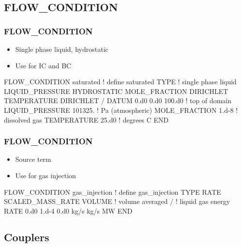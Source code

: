 \documentclass{beamer}
\newcommand\redcomment[1]{{{\color{red} #1}}}
\newcommand\bluecomment[1]{{{\color{blue} #1}}}
\newcommand\greencomment[1]{{{\color{green} #1}}}
\begin{document}
\subsection{FLOW\_CONDITION}

\begin{frame}[fragile]\frametitle{FLOW\_CONDITION}
\begin{itemize}
  \item{Single phase liquid, hydrostatic}
  \item{Use for \redcomment{IC} and \redcomment{BC}}
\end{itemize}

\begin{semiverbatim}
FLOW_CONDITION saturated \bluecomment{! define }\greencomment{saturated} 
  TYPE                   \bluecomment{! single phase liquid}
    LIQUID_PRESSURE HYDROSTATIC
    MOLE_FRACTION DIRICHLET
    TEMPERATURE DIRICHLET
  /
  DATUM 0.d0 0.d0 100.d0  \bluecomment{! top of domain}
  LIQUID_PRESSURE 101325. \bluecomment{! Pa (atmospheric)}
  MOLE_FRACTION 1.d-8     \bluecomment{! dissolved gas}
  TEMPERATURE 25.d0       \bluecomment{! degrees C}
END
\end{semiverbatim}
\end{frame}

\begin{frame}[fragile]\frametitle{FLOW\_CONDITION}
\begin{itemize}
  \item{\redcomment{Source} term}
  \item{Use for gas injection}
\end{itemize}

\begin{semiverbatim}
FLOW_CONDITION gas_injection \bluecomment{! define }\greencomment{gas_injection} 
  TYPE
    RATE SCALED_MASS_RATE VOLUME \bluecomment{! volume averaged}
  /
       \bluecomment{! liquid gas energy}
  RATE 0.d0 1.d-4 0.d0 kg/s kg/s MW
END
\end{semiverbatim}
\end{frame}

\subsection{Couplers}
\end{document}
